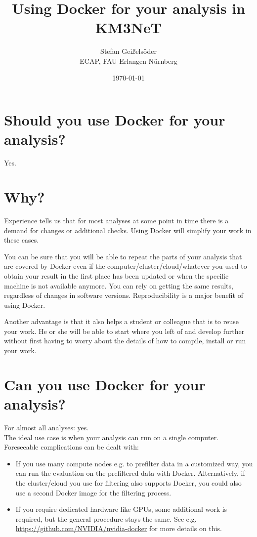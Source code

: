 \documentclass[a4paper, twoside, 11pt]{article}
\begin{document}
\title{Using Docker for your analysis in KM3NeT}
\author{Stefan Geißelsöder\\
ECAP, FAU Erlangen-Nürnberg}
\date{\today}
\maketitle

\section{Should you use Docker for your analysis?}

Yes. 

\section{Why?}

Experience tells us that for most analyses at some point in time there 
is a demand for changes or additional checks. 
Using Docker will simplify your work in these cases. 

You can be sure that you will be able to repeat the parts 
of your analysis that are covered by Docker even if the 
computer/cluster/cloud/whatever you used to obtain your result in the first place 
has been updated or when the specific machine is not available anymore.
You can rely on getting the same results, 
regardless of changes in software versions. 
Reproducibility is a major benefit of using Docker. 

Another advantage is that it also helps a student or colleague that is to reuse your work. 
He or she will be able to start where you left of and develop further 
without first having to worry about the details of how to compile, install or run your work.  

\section{Can you use Docker for your analysis?}

For almost all analyses: yes. \\
The ideal use case is when your analysis can run on a single computer. 
Foreseeable complications can be dealt with:
\begin{itemize}
 \item If you use many compute nodes e.g. to prefilter data in a customized way, 
 you can run the evaluation on the prefiltered data with Docker. 
 Alternatively, if the cluster/cloud you use for filtering also supports Docker, 
 you could also use a second Docker image for the filtering process. 
 \item If you require dedicated hardware like GPUs, some additional work is required, 
 but the general procedure stays the same. 
 See e.g. \url{https://github.com/NVIDIA/nvidia-docker} for more details on this. 
\end{itemize}
\end{document}
